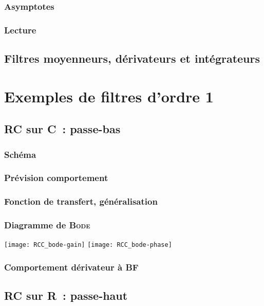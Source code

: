 \documentclass[../../main/main.tex]{subfiles}
\begin{document}
\subsubsection{Asymptotes}

\subsubsection{Lecture}

\subsection{Filtres moyenneurs, dérivateurs et intégrateurs}

\section{Exemples de filtres d'ordre 1}
\subsection{RC sur C~: passe-bas}
\subsubsection{Schéma}
\subsubsection{Prévision comportement}
\subsubsection{Fonction de transfert, généralisation}
\subsubsection{Diagramme de \textsc{Bode}}
\begin{center}
	\texttt{[image: RCC\_bode-gain]}
	\texttt{[image: RCC\_bode-phase]}
\end{center}
\subsubsection{Comportement dérivateur à BF}

\subsection{RC sur R~: passe-haut}
\end{document}

